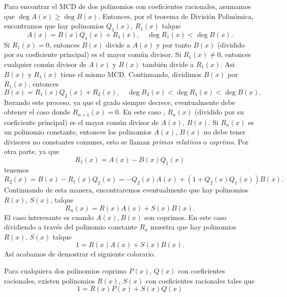 Para encontrar el MCD de dos polinomios con coeficientes racionales, asumamos que $\deg{A(x)} \geq \deg{B(x)}$.
Entonces, por el teorema de División Polinómica, encontramos que hay polinomios $Q_1(x)$, $R_1(x)$ talque
\[
    A(x) = B(x) Q_1(x) + R_1(x),\quad \deg{R_1(x)} < \deg{B(x)}.
\]
Si $R_1(x) = 0$, entonces $B(x)$ divide a $A(x)$ y por tanto $B(x)$ (dividido por su coeficiente principal) es el mayor común divisor.
Si $R_1(x) \neq 0$, entonces cualquier común divisor de $A(x)$ y $B(x)$ también divide a $R_1(x)$.
Asi $B(x)$ y $R_1(x)$ tiene el mismo MCD.
Continuando, dividimos $B(x)$ por $R_1(x)$, entonces
\[
    B(x) = R_1(x) Q_2(x) + R_2(x), \quad \deg{R_2(x)} < \deg{R_1(x)} < \deg{B(x)}.
\]
Iterando este proceso, ya que el grado siempre decrece, eventualmente debe obtener el caso donde $R_{n + 1}(x) = 0$.
En este caso , $R_n(x)$ (dividido por su coeficiente principal) es el mayor común divisor de $A(x)$, $B(x)$.
Si $R_n (x)$ es un polinomio constante, entonces los polinomios $A(x)$, $B(x)$ no debe tener divisores no constantes comunes, esto se llaman \textit{primos relativos} o \textit{coprimo}.
Por otra parte, ya que
\[
    R_1(x) = A(x) - B(x) Q_1(x)
\]
tenemos
\[
    R_2 (x) = B(x) - R_1(x) Q_2(x) = - Q_2(x) A(x) + \left(1 + Q_2(x) Q_1(x)\right) B(x).
\]
Continuando de esta manera, encontraremos eventualmente que hay polinomios $R(x)$, $S(x)$, talque
\[
    R_n(x) = R(x) A(x) + S(x) B(x).
\]
El caso interesante es cuando $A(x), B(x)$ son coprimos.
En este caso dividiendo a través del polinomio constante $R_n$ muestra que hay polinomios $R(x)$, $S(x)$ talque
\[
    1 = R(x) A(x) + S(x) B(x).
\]
Así acabamos de demostrar el siguiente colorario.

\begin{corollary}
    Para cualquiera dos polinomios coprimo $P(x)$, $Q(x)$ con coeficientes racionales,
    existen polinomios $R(x)$, $S(x)$ con coeficientes racionales tales que
    \[
        1 = R(x) P(x) + S(x) Q(x)
    \]
\end{corollary}

